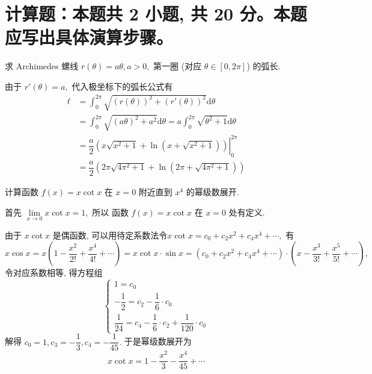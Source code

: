 \section{计算题：本题共 2 小题, 共 20 分。本题应写出具体演算步骤。}


\begin{question}[points = 10]
求 Archimedes 螺线 $r(\theta) = a\theta, a > 0,$ 第一圈 (对应 $\theta \in [0, 2\pi]$) 的弧长.

\end{question}

\begin{solution}
由于 $r'(\theta) = a,$ 代入极坐标下的弧长公式有
\begin{align*}
\ell & = \int_{0}^{2\pi} \sqrt{\left(r(\theta)\right)^2 + \left(r'(\theta)\right)^2} \mathrm{d} \theta \\
& = \int_{0}^{2\pi} \sqrt{\left(a \theta\right)^2 + a^2} \mathrm{d} \theta = a \int_{0}^{2\pi} \sqrt{\theta^2 + 1} \mathrm{d} \theta \\
& = \left. \dfrac{a}{2} \left( x \sqrt{x^2 + 1} + \ln \left( x + \sqrt{x^2 + 1} \right) \right) \right|_{0}^{2\pi} \\
& = \dfrac{a}{2} \left( 2\pi \sqrt{4 \pi^2 + 1} + \ln \left( 2\pi + \sqrt{4 \pi^2 + 1} \right) \right)
\end{align*}
\end{solution}

\begin{question}[points = 10]
计算函数 $f(x) = x\cot x$ 在 $x = 0$ 附近直到 $x^4$ 的幂级数展开.

\end{question}

\begin{solution}
首先 $\lim\limits_{x \to 0} x\cot x = 1,$ 所以 函数 $f(x) = x\cot x$ 在 $x = 0$ 处有定义.

由于 $x\cot x$ 是偶函数, 可以用待定系数法令$x\cot x = c_0 + c_2 x^2 + c_4 x^4 + \cdots,$ 有
$$x\cos x = x\left( 1 - \dfrac{x^2}{2!} + \dfrac{x^4}{4!} + \cdots \right) = x\cot x \cdot \sin x = \left( c_0 + c_2 x^2 + c_4 x^4 + \cdots \right) \cdot \left(x - \dfrac{x^3}{3!} + \dfrac{x^5}{5!} + \cdots\right),$$
令对应系数相等, 得方程组
$$\begin{cases}
1 = c_0 \\
-\dfrac{1}{2} = c_2 - \dfrac{1}{6} \cdot c_0 \\
\dfrac{1}{24} = c_4 - \dfrac{1}{6} \cdot c_2 + \dfrac{1}{120} \cdot c_0
\end{cases}$$
解得 $c_0 = 1, c_3 = - \dfrac{1}{3}, c_4 = - \dfrac{1}{45}.$ 于是幂级数展开为
$$x\cot x = 1 - \dfrac{x^2}{3} - \dfrac{x^4}{45} + \cdots$$
\end{solution}


